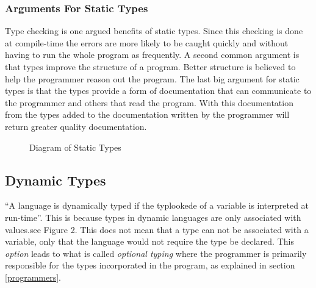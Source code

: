 \documentclass{sig-alternate}
\begin{document}
\subsubsection{Arguments For Static Types}\label{arguments}
Type checking is one argued benefits of static types. Since this checking is done at compile-time the errors are more likely to be caught quickly and without having to run the whole program as frequently. A second common argument is that types improve the structure of a program. Better structure is believed to help the programmer reason out the program. The last big argument for static types is that the types provide a form of documentation that can communicate to the programmer and others that read the program. With this documentation from the types added to the documentation written by the programmer will return greater quality documentation.

\begin{figure}
\centering
{}
\caption{Diagram of Static Types \cite{Ferg2012}}
\end{figure}

\subsection{Dynamic Types} \label{dynamic}
``A language is dynamically typed if the typlookede of a variable is interpreted at run-time''\cite{NomeN2009}. This is because types in dynamic languages are only associated with values\cite{Pierce2002}.see Figure 2. This does not mean that a type can not be associated with a variable, only that the language would not require the type be declared. This \emph{option} leads to what is called \emph{optional typing} where the programmer is primarily  responsible for the types incorporated in the program, as explained in section \ref{programmers}. 
\end{document}
